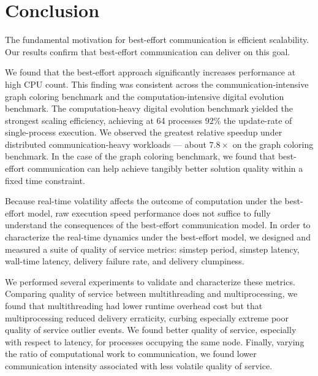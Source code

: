\section{Conclusion}

The fundamental motivation for best-effort communication is efficient scalability.
Our results confirm that best-effort communication can deliver on this goal.

We found that the best-effort approach significantly increases performance at high CPU count.
This finding was consistent across the communication-intensive graph coloring benchmark and the computation-intensive digital evolution benchmark.
The computation-heavy digital evolution benchmark yielded the strongest scaling efficiency, achieving at 64 processes 92\% the update-rate of single-process execution.
We observed the greatest relative speedup under distributed communication-heavy workloads --- about $7.8\times$ on the graph coloring benchmark.
In the case of the graph coloring benchmark, we found that best-effort communication can help achieve tangibly better solution quality within a fixed time constraint.

Because real-time volatility affects the outcome of computation under the best-effort model, raw execution speed performance does not suffice to fully understand the consequences of the best-effort communication model.
In order to characterize the real-time dynamics under the best-effort model, we designed and measured a suite of quality of service metrics: simstep period, simstep latency, wall-time latency, delivery failure rate, and delivery clumpiness.

We performed several experiments to validate and characterize these metrics.
Comparing quality of service between multithreading and multiprocessing, we found that multithreading had lower runtime overhead cost but that multiprocessing reduced delivery erraticity, curbing especially extreme poor quality of service outlier events.
We found better quality of service, especially with respect to latency, for processes occupying the same node.
Finally, varying the ratio of computational work to communication, we found lower communication intensity associated with less volatile quality of service.

